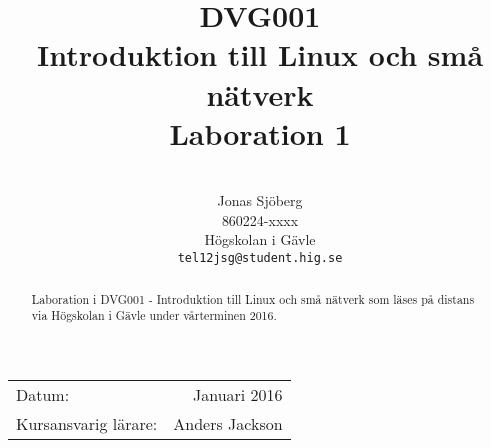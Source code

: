 \documentclass[11pt,a4paper]{article}
\title{\textsc{DVG001}                         \\ 
       Introduktion till Linux och små nätverk \\ 
       Laboration 1}
\author{                                 \\
  Jonas Sjöberg                          \\
  860224-xxxx                            \\
  Högskolan i Gävle                      \\
  \texttt{tel12jsg@student.hig.se}       \\
}
\date{}
\begin{document}
  \maketitle

  \begin{center}
  \begin{tabular}{l r}
    Datum:               & Januari 2016   \\
    Kursansvarig lärare: & Anders Jackson
  \end{tabular}
  \end{center}

  \begin{abstract}
    Laboration i DVG001 - Introduktion till Linux och små nätverk som läses på distans via Högskolan i Gävle under vårterminen 2016.
  \end{abstract}

  \newpage
  \setcounter{tocdepth}{3}
  \tableofcontents
  \newpage

  
  
% 

\end{document}
